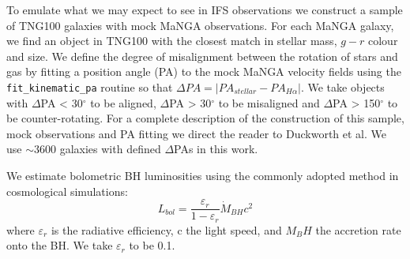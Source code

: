 \documentclass[fleqn,usenatbib]{mnras}
\begin{document}
To emulate what we may expect to see in IFS observations we construct a sample of TNG100 galaxies with mock MaNGA observations. 
For each MaNGA galaxy, we find an object in TNG100 with the closest match in stellar mass, $g-r$ colour and size. We define the degree of misalignment between the rotation of stars and gas by fitting a position angle (PA) to the mock MaNGA velocity fields using the \texttt{fit\_kinematic\_pa} routine \citep[see Appendix C of][]{krajnovic2006} so that $\Delta PA = |PA_{stellar} - PA_{H\alpha}|$. We take objects with $\Delta$PA < 30$^{\circ}$ to be aligned, $\Delta$PA > 30$^{\circ}$ to be misaligned and $\Delta$PA > 150$^{\circ}$ to be counter-rotating. For a complete description of the construction of this sample, mock observations and PA fitting we direct the reader to Duckworth et al. We use $\sim$3600 galaxies with defined $\Delta$PAs in this work. 

We estimate bolometric BH luminosities using the commonly adopted method in cosmological simulations: 
\begin{equation}
L_{bol} = \frac{\varepsilon_r}{1 - \varepsilon_r} \dot{M}_{BH} c^2
\end{equation}
where $\varepsilon_r$ is the radiative efficiency, c the light speed, and $M_BH$ the accretion rate onto the BH. We take $\varepsilon_r$ to be 0.1.
\end{document}
